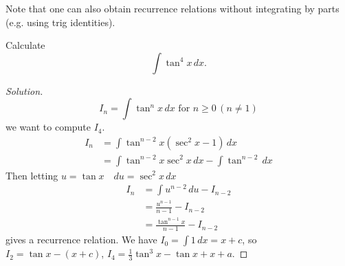 \documentclass[10pt, a4paper]{article}
\begin{document}
Note that one can also obtain recurrence relations without integrating by parts (e.g. using trig identities).
\begin{example}
    Calculate
    \[
    \int\tan ^ 4 x\,dx.
    \]
    \begin{proof}[Solution]\renewcommand{\qedsymbol}{}
        \[
        I_n = \int\tan ^ n x\,dx\text{ for } n \geq 0\, (n \neq 1)
        \]
        we want to compute $I_4$.
        \begin{align*}
            I_n &= \int\tan ^ {n - 2}x(\sec ^ 2 x - 1)\,dx \\
            &= \int\tan ^ {n - 2} x\sec ^ 2 x\,dx - \int\tan ^ {n - 2}\,dx
        \end{align*}
        Then letting $u = \tan x\quad du = \sec ^ 2 x\,dx$
        \begin{align*}
            I_n &= \int u ^ {n - 2}\,du - I_{n - 2} \\
            &= \frac{u ^ {n - 1}}{n - 1} - I_{n - 2} \\
            &= \frac{\tan ^ {n - 1} x}{n - 1} - I_{n - 2}
        \end{align*}
        gives a recurrence relation.
        We have $I_0 = \int 1\,dx = x + c$,
        so $I_2 = \tan x - (x + c)$, $I_4 = \frac{1}{3}\tan ^ 3 x - \tan x + x + a$.
    \end{proof}
\end{example}
\end{document}

